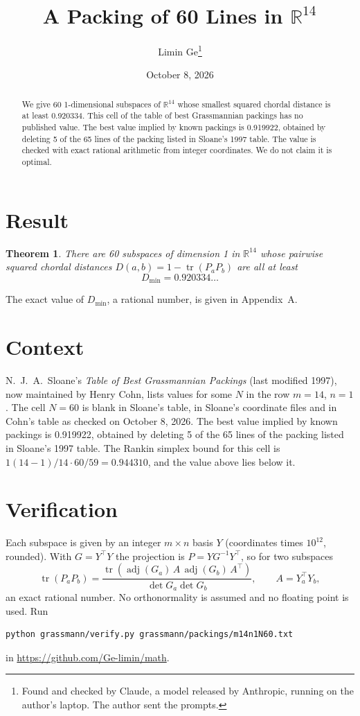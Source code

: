 \documentclass[11pt,a4paper]{article}
\title{A Packing of 60 Lines in $\mathbb{R}^{14}$}
\author{Limin Ge\thanks{Found and checked by Claude, a model released by Anthropic, running on the author's laptop. The author sent the prompts.}}
\date{October 8, 2026}
\newtheorem*{theorem}{Theorem}
\begin{document}
\maketitle
\begin{abstract}
We give 60 1-dimensional subspaces of $\mathbb{R}^{14}$ whose smallest squared chordal distance is at least 0.920334. This cell of the table of best Grassmannian packings has no published value. The best value implied by known packings is 0.919922, obtained by deleting 5 of the 65 lines of the packing listed in Sloane's 1997 table. The value is checked with exact rational arithmetic from integer coordinates. We do not claim it is optimal.
\end{abstract}

\section{Result}
\begin{theorem}
There are 60 subspaces of dimension 1 in $\mathbb{R}^{14}$ whose pairwise squared chordal distances $D(a,b) = 1 - \operatorname{tr}(P_aP_b)$ are all at least
\[ D_{\min} = 0.920334\ldots \]
\end{theorem}
The exact value of $D_{\min}$, a rational number, is given in Appendix~A.


\section{Context}
N.~J.~A.~Sloane's \emph{Table of Best Grassmannian Packings} (last modified 1997), now maintained by Henry Cohn, lists values for some $N$ in the row $m=14$, $n=1$. The cell $N=60$ is blank in Sloane's table, in Sloane's coordinate files and in Cohn's table as checked on October 8, 2026. The best value implied by known packings is 0.919922, obtained by deleting 5 of the 65 lines of the packing listed in Sloane's 1997 table. The Rankin simplex bound for this cell is $1(14-1)/14\cdot 60/59 = 0.944310$, and the value above lies below it.


\section{Verification}
Each subspace is given by an integer $m\times n$ basis $Y$ (coordinates times $10^{12}$, rounded). With $G=Y^\top Y$ the projection is $P=YG^{-1}Y^\top$, so for two subspaces
\[ \operatorname{tr}(P_aP_b)=\frac{\operatorname{tr}(\operatorname{adj}(G_a)\,A\,\operatorname{adj}(G_b)\,A^\top)}{\det G_a\det G_b},\qquad A=Y_a^\top Y_b, \]
an exact rational number. No orthonormality is assumed and no floating point is used. Run
\begin{verbatim}
python grassmann/verify.py grassmann/packings/m14n1N60.txt
\end{verbatim}
in \url{https://github.com/Ge-limin/math}.
\end{document}
